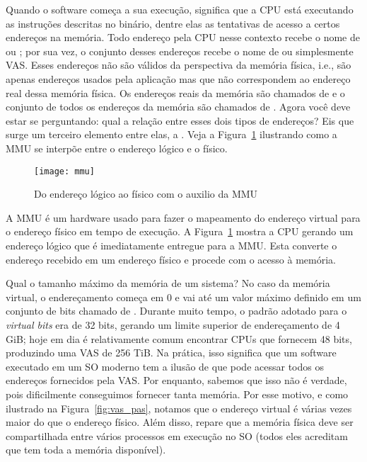 Quando o software começa a sua execução, significa que a CPU está executando as
instruções descritas no binário, dentre elas as tentativas de acesso a certos
endereços na memória. Todo endereço  pela CPU nesse contexto recebe o nome de
 ou ; por sua vez,
o conjunto desses endereços recebe o nome de  ou simplesmente VAS. Esses 
endereços não são
válidos da perspectiva da memória física, i.e., são apenas endereços usados pela
aplicação mas que não correspondem ao endereço real dessa memória física. Os
endereços reais da memória são chamados de  e o
conjunto de todos os endereços da memória são chamados de . Agora você deve estar se perguntando: qual a relação
entre esses dois tipos de endereços? Eis que surge um terceiro elemento entre elas, a
. Veja a Figura~\ref{fig:mmu}
ilustrando como a MMU se interpõe entre o endereço lógico e o físico.

\begin{figure}[!h]
  \centering
  \texttt{[image: mmu]} 
  \caption{Do endereço lógico ao físico com o auxilio da MMU}
  \label{fig:mmu}
\end{figure}

A MMU é um hardware usado para fazer o mapeamento do endereço virtual para o
endereço físico em tempo de execução. A Figura~\ref{fig:mmu} mostra a CPU
gerando um endereço lógico que é imediatamente entregue para a MMU. Esta
converte o endereço recebido em um endereço físico e procede com o acesso à
memória. 


Qual o tamanho máximo da memória de um sistema?
No caso da memória virtual, o endereçamento
começa em 0 e vai até um valor máximo definido em um conjunto de bits chamado
de . Durante muito tempo, o padrão adotado para o
\emph{virtual bits} era de 32 bits, gerando um limite superior de endereçamento
de 4 GiB; hoje em dia é relativamente comum encontrar CPUs que fornecem 48
bits, produzindo uma VAS de 256 TiB.  Na prática, isso significa que um
software executado em um SO moderno tem a ilusão de que pode acessar todos os
endereços fornecidos pela VAS. Por enquanto, sabemos que isso não é verdade,
pois dificilmente conseguimos fornecer tanta memória. Por esse motivo, e como
ilustrado na Figura~\ref{fig:vas_pas}, notamos que o endereço virtual é várias
vezes maior do que o endereço físico. Além disso, repare que a memória física
deve ser compartilhada entre vários processos em execução no SO (todos eles
acreditam que tem toda a memória disponível).

